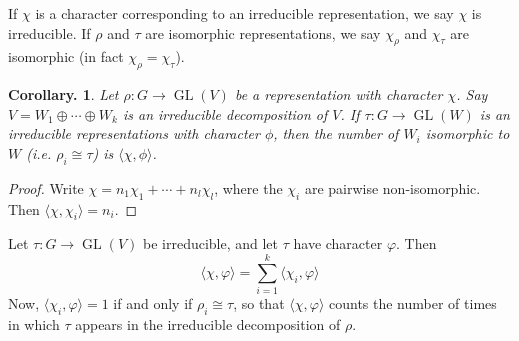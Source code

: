 \documentclass[11pt, a4paper]{memoir}
\theoremstyle{change}
\newtheorem{corollary}[theorem]{Corollary.}
\theoremstyle{plain}
\theoremstyle{nonumberplain}
\newtheorem{proof}{Proof}
\DeclareMathOperator{\GL}{GL}
\numberwithin{equation}{section}
\begin{document}
If $\chi$ is a character corresponding to an irreducible representation, we say $\chi$ is irreducible.
If $\rho$ and $\tau$ are isomorphic representations, we say $\chi_\rho$ and $\chi_\tau$ are isomorphic (in fact $\chi_\rho=\chi_\tau$).
\begin{corollary}
    Let $\rho:G\to\GL(V)$ be a representation with character $\chi$.
    Say $V=W_1\oplus\cdots\oplus W_k$ is an irreducible decomposition of $V$.
    If $\tau:G\to\GL(W)$ is an irreducible representations with character $\phi$, then the number of $W_i$ isomorphic to $W$ (i.e. $\rho_i\cong\tau$) is $\langle\chi,\phi\rangle$.
\end{corollary}
\begin{proof}
    Write $\chi=n_1\chi_1+\cdots+n_l\chi_l$, where the $\chi_i$ are pairwise non-isomorphic.
    Then $\langle\chi,\chi_i\rangle=n_i$.
\end{proof}
Let $\tau:G\to\GL(V)$ be irreducible, and let $\tau$ have character $\varphi$.
Then
\begin{equation*}
    \langle \chi,\varphi\rangle = \sum_{i=1}^k\langle\chi_i,\varphi\rangle
\end{equation*}
Now, $\langle\chi_i,\varphi\rangle=1$ if and only if $\rho_i\cong\tau$, so that $\langle\chi,\varphi\rangle$ counts the number of times in which $\tau$ appears in the irreducible decomposition of $\rho$.
\end{document}
